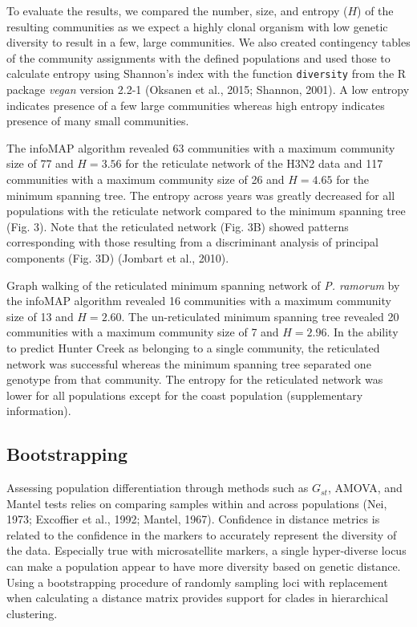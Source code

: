 \documentclass{frontiersSCNS} %
\begin{document}
To evaluate the results, we compared the number, size, and entropy
(\(H\)) of the resulting communities as we expect a highly clonal
organism with low genetic diversity to result in a few, large
communities. We also created contingency tables of the community
assignments with the defined populations and used those to calculate
entropy using Shannon's index with the function \texttt{diversity} from
the R package \emph{vegan} version 2.2-1 (Oksanen et al., 2015; Shannon,
2001). A low entropy indicates presence of a few large communities
whereas high entropy indicates presence of many small communities.

The infoMAP algorithm revealed 63 communities with a maximum community
size of 77 and \(H = 3.56\) for the reticulate network of the H3N2 data
and 117 communities with a maximum community size of 26 and \(H = 4.65\)
for the minimum spanning tree. The entropy across years was greatly
decreased for all populations with the reticulate network compared to
the minimum spanning tree (Fig. 3). Note that the reticulated network
(Fig. 3B) showed patterns corresponding with those resulting from a
discriminant analysis of principal components (Fig. 3D) (Jombart et al.,
2010).

Graph walking of the reticulated minimum spanning network of \emph{P.
ramorum} by the infoMAP algorithm revealed 16 communities with a maximum
community size of 13 and \(H = 2.60\). The un-reticulated minimum
spanning tree revealed 20 communities with a maximum community size of 7
and \(H = 2.96\). In the ability to predict Hunter Creek as belonging to
a single community, the reticulated network was successful whereas the
minimum spanning tree separated one genotype from that community. The
entropy for the reticulated network was lower for all populations except
for the coast population (supplementary information).

\subsection*{Bootstrapping}\label{bootstrapping}

Assessing population differentiation through methods such as \(G_{st}\),
AMOVA, and Mantel tests relies on comparing samples within and across
populations (Nei, 1973; Excoffier et al., 1992; Mantel, 1967).
Confidence in distance metrics is related to the confidence in the
markers to accurately represent the diversity of the data. Especially
true with microsatellite markers, a single hyper-diverse locus can make
a population appear to have more diversity based on genetic distance.
Using a bootstrapping procedure of randomly sampling loci with
replacement when calculating a distance matrix provides support for
clades in hierarchical clustering.
\end{document}
